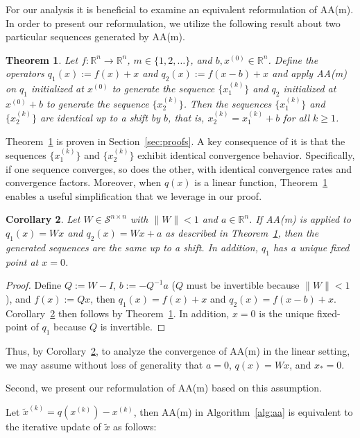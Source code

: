 \documentclass[11pt]{article}
\newtheorem{theorem}{Theorem}%
\newtheorem{corollary}[theorem]{Corollary}
\newcommand{\R}{\mathbb{R}}
\newcommand{\Symn}{\mathcal{S}^{n \times n}}
\begin{document}
{\color{black}
For our analysis it is beneficial to examine an equivalent reformulation of AA(m). 
In order to present our reformulation, we utilize the following result about two particular sequences generated by AA(m).
\begin{theorem}\label{thm:AA_invariance}
Let $f:\R^n \rightarrow \R^n$, $m \in \{1,2,\hdots\}$, and $b, x^{(0)} \in \R^n$.
Define the operators $q_1(x) := f(x) + x$ and $q_{2}(x):= f(x-b)+x$ and 
apply AA(m) on $q_1$ initialized at $x^{(0)}$ to generate the sequence $\{x^{(k)}_1\}$ and $q_{2}$ initialized at $x^{(0)} +b$ to generate the sequence $\{x^{(k)}_{2}\}$. 
Then the sequences 
$\{x^{(k)}_1\}$ and $\{x^{(k)}_{2}\}$ are identical up to a shift by $b$, that is, $x^{(k)}_{2} = x^{(k)}_{1} + b$ for all $k \geq 1$. 
\end{theorem}

Theorem~\ref{thm:AA_invariance} is proven in Section~\ref{sec:proofs}. 
A key consequence of it is that the sequences $\{x_1^{(k)}\}$ and $\{x_2^{(k)}\}$ exhibit identical convergence behavior. Specifically, if one sequence converges, so does the other, with identical convergence rates and convergence factors. Moreover, when $q(x)$ is a linear function, Theorem~\ref{thm:AA_invariance} 
enables a useful simplification that we leverage in our proof. 
\begin{corollary}\label{cor:simplify_linear}
Let $W\in \Symn$ with $\|W\|<1$ and $a \in \R^n$. If AA(m) is applied to $q_1(x) = Wx$ and $q_2(x) = Wx+a$ as described in Theorem~\ref{thm:AA_invariance}, then the generated sequences are the same up to a shift. In addition,  $q_1$ has a unique fixed point at $x = 0$. 
\end{corollary}
\begin{proof}
Define $Q:=W-I$, $b:=-Q^{-1}a$ ($Q$ must be invertible because $\|W\| <1$), and $f(x) := Qx$,  
then $q_1(x) = f(x)+x$ and $q_2(x) =f(x-b) + x$. Corollary~\ref{cor:simplify_linear} then follows by 
Theorem~\ref{thm:AA_invariance}. 
In addition, $x = 0$ is the unique fixed-point of $q_1$ because $Q$ is invertible.
\end{proof}
Thus, by Corollary~\ref{cor:simplify_linear}, to analyze the convergence of AA(m) in the linear setting, we may assume without loss of generality that ${a}={0}$, $q(x)=Wx$, and ${x}_* = {0}$.


Second, we present our reformulation of AA(m) based on this assumption.} Let $\widetilde{x}^{(k)}=q(x^{(k)})-x^{(k)}$, then AA(m) in Algorithm~\ref{alg:aa} is equivalent to the iterative update of $\widetilde{x}$ as follows:
\end{document}
